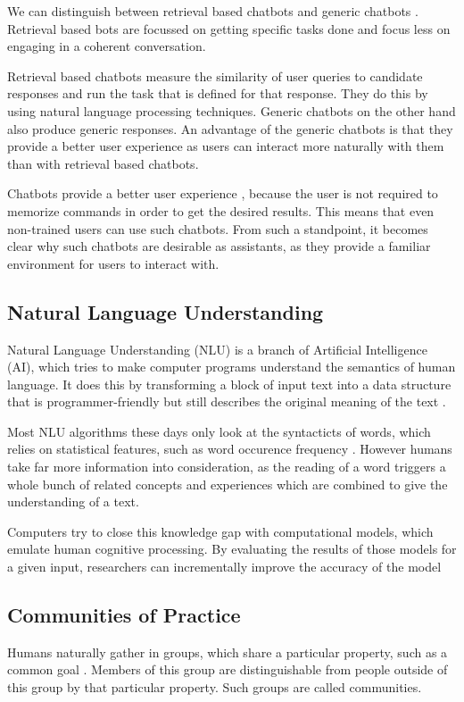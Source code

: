 We can distinguish between retrieval based chatbots and generic chatbots \cite{NLKl19,WWX*16}. Retrieval based bots are focussed on getting specific tasks done and focus less on engaging in a coherent conversation.

Retrieval based chatbots measure the similarity of user queries to candidate responses and run the task that is defined for that response. They do this by using natural language processing techniques. Generic chatbots on the other hand also produce generic responses. An advantage of the generic chatbots is that they provide a better user experience as users can interact more naturally with them than with retrieval based chatbots.

Chatbots provide a better user experience \cite{CHW*17}, because the user is not required to memorize commands in order to get the desired results. This means that even non-trained users can use such chatbots. From such a standpoint, it becomes clear why such chatbots are desirable as assistants, as they provide a familiar environment for users to interact with.

\subsection{Natural Language Understanding}
Natural Language Understanding (NLU) is a branch of Artificial Intelligence (AI), which tries to make computer programs understand the semantics of human language. It does this by transforming a block of input text into a data structure that is programmer-friendly but still describes the original meaning of the text \cite{CWB*11}.

Most NLU algorithms these days only look at the syntacticts of words, which relies on statistical features, such as word occurence frequency \cite{CaWh14}. However humans take far more information into consideration, as the reading of a word triggers a whole bunch of related concepts and experiences which are combined to give the understanding of a text.

Computers try to close this knowledge gap with computational models, which emulate human cognitive processing. By evaluating the results of those models for a given input, researchers can incrementally improve the accuracy of the model \cite{CaWh14}


\subsection{Communities of Practice}
Humans naturally gather in groups, which share a particular property, such as a common goal \cite{RKJa15}. Members of this group are distinguishable from people outside of this group by that particular property. Such groups are called communities.

